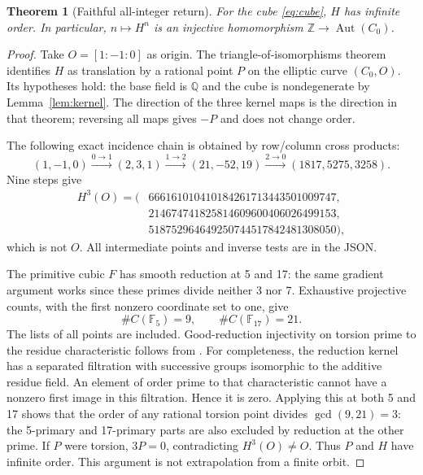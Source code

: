 \documentclass[11pt,reqno]{amsart}
\newtheorem{theorem}{Theorem}[section]
\theoremstyle{definition}\newtheorem{definition}[theorem]{Definition}
\theoremstyle{remark}\newtheorem{remark}[theorem]{Remark}
\newcommand{\Q}{\mathbb Q}\newcommand{\R}{\mathbb R}\newcommand{\C}{\mathbb C}\newcommand{\Z}{\mathbb Z}\newcommand{\OO}{\mathbb O}
\begin{document}
\begin{theorem}[Faithful all-integer return]\label{thm:infinite}
For the cube \eqref{eq:cube}, $H$ has infinite order. In particular,
$n\mapsto H^n$ is an injective homomorphism $\Z\to\operatorname{Aut}(C_0)$.
\end{theorem}
\begin{proof}
Take $O=[1:-1:0]$ as origin. The triangle-of-isomorphisms theorem
\cite[\S3.2.3, p.~19; \S5.1.1 following Lemma~5.3, p.~35]{BH} identifies $H$
as translation by a rational point $P$ on the elliptic curve $(C_0,O)$.
Its hypotheses hold: the base field is $\Q$ and the cube is nondegenerate by
Lemma~\ref{lem:kernel}. The direction of the three kernel maps is the direction
in that theorem; reversing all maps gives $-P$ and does not change order.

The following exact incidence chain is obtained by row/column cross products:
\[
 (1,-1,0)\xrightarrow{0\to1}(2,3,1)
 \xrightarrow{1\to2}(21,-52,19)
 \xrightarrow{2\to0}(1817,5275,3258).
\]
Nine steps give
\begin{align*}
 H^3(O)=\big(&666161010410184261713443501009747,\\
 &214674741825814609600406026499153,\\
 &518752964649250744517842481308050\big),
\end{align*}
which is not $O$. All intermediate points and inverse tests are in the JSON.

The primitive cubic $F$ has smooth reduction at 5 and 17: the same gradient
argument works since these primes divide neither 3 nor 7. Exhaustive projective
counts, with the first nonzero coordinate set to one, give
\[
 \#C(\mathbb F_5)=9,\qquad \#C(\mathbb F_{17})=21.
\]
The lists of all points are included. Good-reduction injectivity on torsion
prime to the residue characteristic follows from
\cite[Chapter II, Theorem~4.1 and Corollary~4.2, pp.~62--64]{Milne}.
For completeness, the reduction kernel has a separated filtration with
successive groups isomorphic to the additive residue field. An element of
order prime to that characteristic cannot have a nonzero first image in this
filtration. Hence it is zero. Applying this at both 5 and 17 shows that the
order of any rational torsion point divides $\gcd(9,21)=3$: the 5-primary and
17-primary parts are also excluded by reduction at the other prime. If $P$
were torsion, $3P=0$, contradicting $H^3(O)\ne O$. Thus $P$ and $H$ have
infinite order. This argument is not extrapolation from a finite orbit.
\end{proof}
\end{document}
